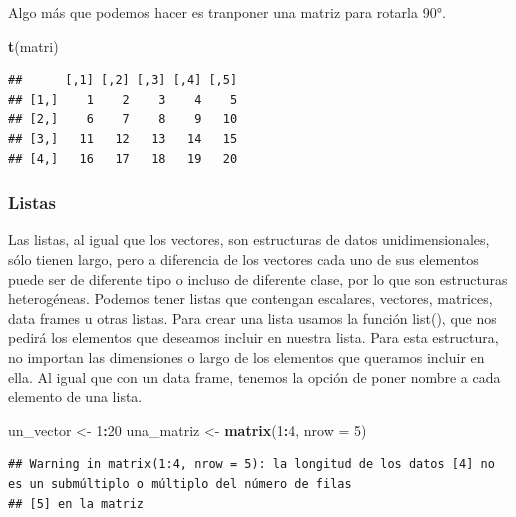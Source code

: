 \documentclass[
]{book}
\newenvironment{Shaded}{\begin{snugshade}}{\end{snugshade}}
\newcommand{\AttributeTok}[1]{\textcolor[rgb]{0.13,0.29,0.53}{#1}}
\newcommand{\DecValTok}[1]{\textcolor[rgb]{0.00,0.00,0.81}{#1}}
\newcommand{\FunctionTok}[1]{\textcolor[rgb]{0.13,0.29,0.53}{\textbf{#1}}}
\newcommand{\NormalTok}[1]{#1}
\newcommand{\OtherTok}[1]{\textcolor[rgb]{0.56,0.35,0.01}{#1}}
\newcommand{\SpecialCharTok}[1]{\textcolor[rgb]{0.81,0.36,0.00}{\textbf{#1}}}
\begin{document}
Algo más que podemos hacer es tranponer una matriz para rotarla 90°.

\begin{Shaded}
\begin{Highlighting}[]
\FunctionTok{t}\NormalTok{(matri)}
\end{Highlighting}
\end{Shaded}

\begin{verbatim}
##      [,1] [,2] [,3] [,4] [,5]
## [1,]    1    2    3    4    5
## [2,]    6    7    8    9   10
## [3,]   11   12   13   14   15
## [4,]   16   17   18   19   20
\end{verbatim}

\subsubsection{Listas}\label{listas}

Las listas, al igual que los vectores, son estructuras de datos unidimensionales, sólo tienen largo, pero a diferencia de los vectores cada uno de sus elementos puede ser de diferente tipo o incluso de diferente clase, por lo que son estructuras heterogéneas.
Podemos tener listas que contengan escalares, vectores, matrices, data frames u otras listas.
Para crear una lista usamos la función list(), que nos pedirá los elementos que deseamos incluir en nuestra lista.
Para esta estructura, no importan las dimensiones o largo de los elementos que queramos incluir en ella.
Al igual que con un data frame, tenemos la opción de poner nombre a cada elemento de una lista.

\begin{Shaded}
\begin{Highlighting}[]
\NormalTok{un\_vector }\OtherTok{\textless{}{-}} \DecValTok{1}\SpecialCharTok{:}\DecValTok{20}
\NormalTok{una\_matriz }\OtherTok{\textless{}{-}} \FunctionTok{matrix}\NormalTok{(}\DecValTok{1}\SpecialCharTok{:}\DecValTok{4}\NormalTok{, }\AttributeTok{nrow =} \DecValTok{5}\NormalTok{)}
\end{Highlighting}
\end{Shaded}

\begin{verbatim}
## Warning in matrix(1:4, nrow = 5): la longitud de los datos [4] no es un submúltiplo o múltiplo del número de filas
## [5] en la matriz
\end{verbatim}
\end{document}
